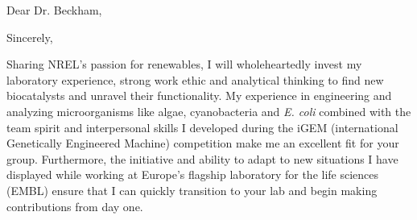 \documentclass[11pt,a4paper,sans]{moderncv}
\begin{document}
\vspace*{-8mm}
\date{\today}
\opening{Dear Dr.  Beckham,}
\closing{Sincerely,}
\makelettertitle
\begin{spacing}{1.15}

\vspace*{-2mm}
Sharing NREL's passion for renewables, I will wholeheartedly invest my laboratory experience, strong work ethic and analytical thinking to find new biocatalysts and unravel their functionality.
My experience in engineering and analyzing microorganisms like algae, cyanobacteria and \textit{E. coli} combined with the team spirit and interpersonal skills I developed during the iGEM (international Genetically Engineered Machine) competition make me an excellent fit for your group. 
Furthermore, the initiative and ability to adapt to new situations I have displayed while working at Europe's flagship laboratory for the life sciences (EMBL) ensure that I can quickly transition to your lab and begin making contributions from day one.\par\vspace*{1.5mm}


\end{spacing}
\end{document}
